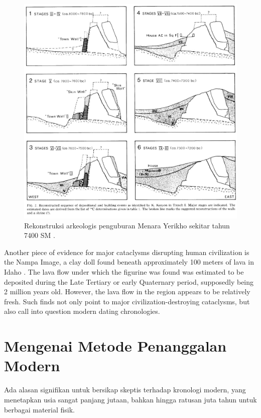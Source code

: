 \documentclass[10pt,twocolumn,letterpaper]{article}
\begin{document}
\begin{figure}[t]
\begin{center}
   \includegraphics[width=1\linewidth]{jericho.jpg}
\end{center}
   \caption{Rekonstruksi arkeologis penguburan Menara Yerikho sekitar tahun 7400 SM \cite{95}.}
\label{fig:14}
\label{fig:onecol}
\end{figure}

Another piece of evidence for major cataclysms disrupting human civilization is the Nampa Image, a clay doll found beneath approximately 100 meters of lava in Idaho \cite{102,103}. The lava flow under which the figurine was found was estimated to be deposited during the Late Tertiary or early Quaternary period, supposedly being 2 million years old. However, the lava flow in the region appears to be relatively fresh. Such finds not only point to major civilization-destroying cataclysms, but also call into question modern dating chronologies.

\section{Mengenai Metode Penanggalan Modern}

Ada alasan signifikan untuk bersikap skeptis terhadap kronologi modern, yang menetapkan usia sangat panjang jutaan, bahkan hingga ratusan juta tahun untuk berbagai material fisik.
\end{document}

